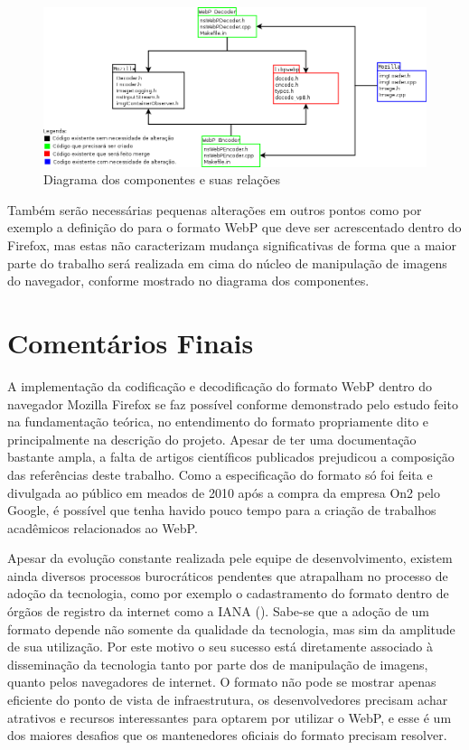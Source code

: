 \documentclass[espaco=simples,appendix=Name]{abnt}
\begin{document}
\begin{figure}[h]
  \centering
    \includegraphics[scale=0.45]{Arquitetura.png}
  \caption{Diagrama dos componentes e suas relações}
\end{figure}

Também serão necessárias pequenas alterações em outros pontos como por exemplo a definição do  para o formato WebP que deve ser acrescentado dentro do Firefox, mas estas não caracterizam mudança significativas de forma que a maior parte do trabalho será realizada em cima do núcleo de manipulação de imagens do navegador, conforme mostrado no diagrama dos componentes.

\chapter{Comentários Finais}

A implementação da codificação e decodificação do formato WebP dentro do navegador Mozilla Firefox se faz possível conforme demonstrado pelo estudo feito na fundamentação teórica, no entendimento do formato propriamente dito e principalmente na descrição do projeto. Apesar de ter uma documentação bastante ampla, a falta de artigos científicos publicados prejudicou a composição das referências deste trabalho. Como a especificação do formato só foi feita e divulgada ao público em meados de 2010 após a compra da empresa On2 pelo Google, é possível que tenha havido pouco tempo para a criação de trabalhos acadêmicos relacionados ao WebP.

Apesar da evolução constante realizada pele equipe de desenvolvimento, existem ainda diversos processos burocráticos pendentes que atrapalham no processo de adoção da tecnologia, como por exemplo o cadastramento do formato dentro de órgãos de registro da internet como a IANA (). Sabe-se que a adoção de um formato depende não somente da qualidade da tecnologia, mas sim da amplitude de sua utilização. Por este motivo o seu sucesso está diretamente associado à disseminação da tecnologia tanto por parte dos  de manipulação de imagens, quanto pelos navegadores de internet. O formato não pode se mostrar apenas eficiente do ponto de vista de infraestrutura, os desenvolvedores precisam achar atrativos e recursos interessantes para optarem por utilizar o WebP, e esse é um dos maiores desafios que os mantenedores oficiais do formato precisam resolver.


\end{document}
